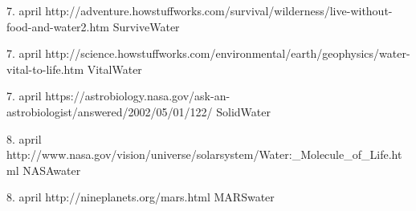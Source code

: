 7. april http://adventure.howstuffworks.com/survival/wilderness/live-without-food-and-water2.htm SurviveWater

7. april http://science.howstuffworks.com/environmental/earth/geophysics/water-vital-to-life.htm VitalWater


7. april https://astrobiology.nasa.gov/ask-an-astrobiologist/answered/2002/05/01/122/ SolidWater

8. april http://www.nasa.gov/vision/universe/solarsystem/Water:_Molecule_of_Life.html NASAwater

8. april http://nineplanets.org/mars.html MARSwater








